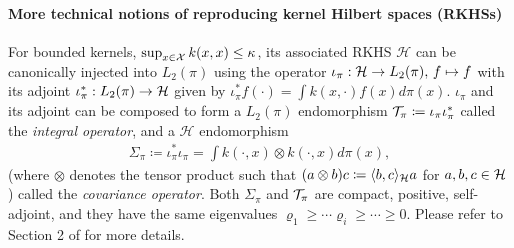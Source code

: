 \paragraph{More technical notions of reproducing kernel Hilbert spaces (RKHSs)}
For bounded kernels, $\sup_{x\in\mathcal{X}} k(x, x) \leq \kappa$, its associated RKHS $\mathcal H$ can be canonically injected into $L_2(\pi)$ using the operator $\iota_{\pi} : \mathcal{H} \to L_2(\pi),\,f\mapsto f$ with its adjoint $ \iota_\pi^\ast: L_2(\pi) \rightarrow \mathcal{H}$ given by $\iota_\pi^\ast f(\cdot) = \int k(x,\cdot)f(x)d\pi(x)$.
$\iota_{\pi}$ and its adjoint can be composed to form a $L_2(\pi)$ endomorphism 
$\mathcal{T}_{\pi} \coloneqq \iota_{ \pi} \iota_{ \pi}^\ast$ 
called the \emph{integral operator}, and a $\mathcal H$ endomorphism  
\begin{align}\label{eq:covariance_operator}
    \Sigma_{\pi} \coloneq \iota_{ \pi}^\ast \iota_{ \pi}=\int k(\cdot, x) \otimes k(\cdot, x) d \pi(x),
\end{align}
(where $\otimes$ denotes the tensor product such that $(a\otimes b)c \coloneqq \langle b,c \rangle_{\mathcal{H}} a$ for $a,b,c\in \mathcal{H}$) called the \emph{covariance operator}.
Both $\Sigma_\pi$ and $\mathcal{T}_{\pi}$ are compact, positive, self-adjoint, and they have the same eigenvalues $\varrho_1 \geq \cdots \varrho_i \geq \cdots \geq 0$. Please refer to Section 2 of \citet{chen2024regularized} for more details. 


